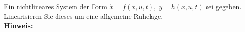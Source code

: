 \begin{question}[section=2,name={Nichtlineares System},difficulty=4,type=mdl,tags={}]
	Ein nichtlineares System der Form $\dot{x} = f(x, u, t),\; y = h(x, u, t)$ sei gegeben. Linearisieren Sie dieses um eine allgemeine Ruhelage.
	\\ \textbf{Hinweis:}\\
	
\end{question}
\begin{solution}
	
\end{solution}